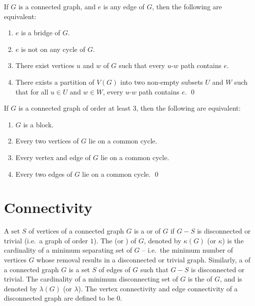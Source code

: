 \begin{Theorem}\label{thm:BridgeChar}
If $G$ is a connected graph, and $e$ is any edge of $G$, then the following are equivalent:
\begin{enumerate}[label=(\roman*)]
\item\label{it:BridgeChar1} $e$ is a bridge of $G$.
\item \label{it:BridgeChar2} $e$ is not on any cycle of $G$.
\item\label{it:BridgeChar3} There exist vertices $u$ and $w$ of $G$ such that every $u$-$w$ path contains $e$.
\item\label{it:BridgeChar4} There exists a partition of $V(G)$ into two non-empty subsets $U$ and $W$ such that for all $u \in U$ and $w \in W$, every $u$-$w$ path contains $e$. \qed
\end{enumerate}
\end{Theorem}

\begin{Theorem}\label{thm:BlockChar}
If $G$ is a connected graph of order at least $3$, then the following are equivalent:
\begin{enumerate}[label=(\roman*)]
\item\label{it:BlockChar1} $G$ is a block.
\item \label{it:BlockChar2} Every two vertices of $G$ lie on a common cycle.
\item\label{it:BlockChar3} Every vertex and edge of $G$ lie on a common cycle.
\item\label{it:BlockChar4} Every two edges of $G$ lie on a common cycle. \qed
\end{enumerate}
\end{Theorem}


\section{Connectivity}\label{sec:Connectivity}

A set $S$ of vertices of a connected graph $G$ is a  or  of $G$ if $G - S$ is disconnected or trivial (i.e.\ a graph of order $1$). The  (or ) of $G$, denoted by $\kappa(G)$ (or $\kappa$) is the cardinality of a minimum separating set of $G$ -- i.e.\ the minimum number of vertices $G$ whose removal results in a disconnected or trivial graph. Similarly, a  of a connected graph $G$ is a set $S$ of edges of $G$ such that $G - S$ is disconnected or trivial. The cardinality of a minimum disconnecting set of $G$ is the  of $G$, and is denoted by $\lambda(G)$ (or $\lambda$). The vertex connectivity and edge connectivity of a disconnected graph are defined to be $0$.

